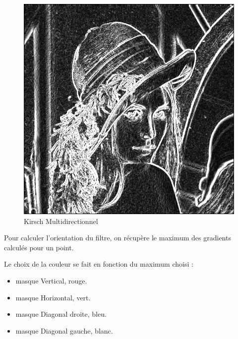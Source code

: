 \documentclass[11pt]{article}
\begin{document}
	\begin{figure}[H]
		\centering
		\includegraphics[scale=0.25]{Image/filtreKirschMultidirectionnel.png}
		\caption{Kirsch Multidirectionnel}
		\label{fig:KirschMultidirectionnel}
	\end{figure}

	Pour calculer l'orientation du filtre, on récupère le maximum des gradients calculés pour un point.

	Le choix de la couleur se fait en fonction du maximum choisi :

	\begin{itemize}
	\item masque Vertical, rouge.
	\item masque Horizontal, vert.
	\item masque Diagonal droite, bleu.
	\item masque Diagonal gauche, blanc.
	\end{itemize}
            
\end{document}
